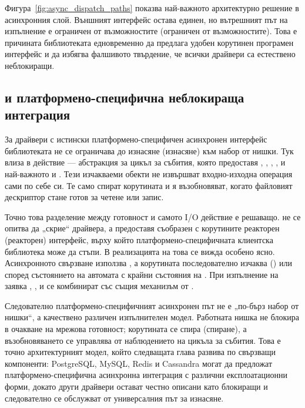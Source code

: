 Фигура~\ref{fig:async_dispatch_paths} показва най-важното архитектурно решение в асинхронния слой. Външният интерфейс остава единен, но вътрешният път на изпълнение е ограничен от възможностите (ограничен от възможностите). Това е причината библиотеката едновременно да предлага удобен корутинен програмен интерфейс и да избягва фалшивото твърдение, че всички драйвери са естествено неблокиращи.

\subsection{ и платформено-специфична неблокираща интеграция}

За драйвери с истински платформено-специфичен асинхронен интерфейс библиотеката не се ограничава до изнасяне (изнасяне) към набор от нишки. Тук влиза в действие  --- абстракция за цикъл за събития, която предоставя , , , ,  и най-важното  и . Тези изчакваеми обекти не извършват входно-изходна операция сами по себе си. Те само спират корутината и я възобновяват, когато файловият дескриптор стане готов за четене или запис.

Точно това разделение между готовност и самото I/O действие е решаващо.  не се опитва да „скрие“ драйвера, а предоставя съобразен с корутините реакторен (реакторен) интерфейс, върху който платформено-специфичната клиентска библиотека може да стъпи. В реализацията на  това се вижда особено ясно. Асинхронното свързване използва , а корутината последователно изчаква ()  или  според състоянието на автомата с крайни състояния на . При изпълнение на заявка , ,  и  се комбинират със същия механизъм от .

Следователно платформено-специфичният асинхронен път не е „по-бърз набор от нишки“, а качествено различен изпълнителен модел. Работната нишка не блокира в очакване на мрежова готовност; корутината се спира (спиране), а възобновяването се управлява от наблюдението на цикъла за събития. Това е точно архитектурният модел, който следващата глава развива по свързващи компоненти: PostgreSQL, MySQL, Redis и Cassandra могат да предложат платформено-специфична асинхронна интеграция с различни експлоатационни форми, докато други драйвери остават честно описани като блокиращи и следователно се обслужват от универсалния път за изнасяне.

